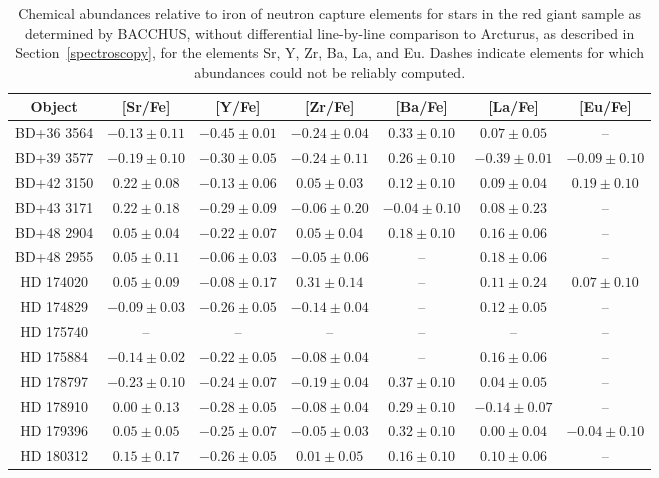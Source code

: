 \begin{table*}
\caption{Chemical abundances relative to iron of neutron capture elements for stars in the red giant sample as determined by BACCHUS, without differential line-by-line comparison to Arcturus, as described in Section~\ref{spectroscopy}, for the elements Sr, Y, Zr, Ba, La, and Eu. Dashes indicate elements for which abundances could not be reliably computed.\label{elems2}}
\begin{tabular}{ccccccc}
\hline \hline
Object & [Sr/Fe] & [Y/Fe] & [Zr/Fe] & [Ba/Fe] & [La/Fe] & [Eu/Fe] \\
\hline
BD+36 3564 & $-0.13 \pm 0.11$ & $-0.45 \pm 0.01$ & $-0.24 \pm 0.04$ & $0.33 \pm 0.10$ & $0.07 \pm 0.05$ & -- \\
BD+39 3577 & $-0.19 \pm 0.10$ & $-0.30 \pm 0.05$ & $-0.24 \pm 0.11$ & $0.26 \pm 0.10$ & $-0.39 \pm 0.01$ & $-0.09 \pm 0.10$ \\
BD+42 3150 & $0.22 \pm 0.08$ & $-0.13 \pm 0.06$ & $0.05 \pm 0.03$ & $0.12 \pm 0.10$ & $0.09 \pm 0.04$ & $0.19 \pm 0.10$ \\
BD+43 3171 & $0.22 \pm 0.18$ & $-0.29 \pm 0.09$ & $-0.06 \pm 0.20$ & $-0.04 \pm 0.10$ & $0.08 \pm 0.23$ & -- \\
BD+48 2904 & $0.05 \pm 0.04$ & $-0.22 \pm 0.07$ & $0.05 \pm 0.04$ & $0.18 \pm 0.10$ & $0.16 \pm 0.06$ & -- \\
BD+48 2955 & $0.05 \pm 0.11$ & $-0.06 \pm 0.03$ & $-0.05 \pm 0.06$ & -- & $0.18 \pm 0.06$ & -- \\
HD 174020 & $0.05 \pm 0.09$ & $-0.08 \pm 0.17$ & $0.31 \pm 0.14$ & -- & $0.11 \pm 0.24$ & $0.07 \pm 0.10$ \\
HD 174829 & $-0.09 \pm 0.03$ & $-0.26 \pm 0.05$ & $-0.14 \pm 0.04$ & -- & $0.12 \pm 0.05$ & -- \\
HD 175740 & -- & -- & -- & -- & -- & -- \\
HD 175884 & $-0.14 \pm 0.02$ & $-0.22 \pm 0.05$ & $-0.08 \pm 0.04$ & -- & $0.16 \pm 0.06$ & -- \\
HD 178797 & $-0.23 \pm 0.10$ & $-0.24 \pm 0.07$ & $-0.19 \pm 0.04$ & $0.37 \pm 0.10$ & $0.04 \pm 0.05$ & -- \\
HD 178910 & $0.00 \pm 0.13$ & $-0.28 \pm 0.05$ & $-0.08 \pm 0.04$ & $0.29 \pm 0.10$ & $-0.14 \pm 0.07$ & -- \\
HD 179396 & $0.05 \pm 0.05$ & $-0.25 \pm 0.07$ & $-0.05 \pm 0.03$ & $0.32 \pm 0.10$ & $0.00 \pm 0.04$ & $-0.04 \pm 0.10$ \\
HD 180312 & $0.15 \pm 0.17$ & $-0.26 \pm 0.05$ & $0.01 \pm 0.05$ & $0.16 \pm 0.10$ & $0.10 \pm 0.06$ & -- \\

\end{tabular}
\end{table*}

